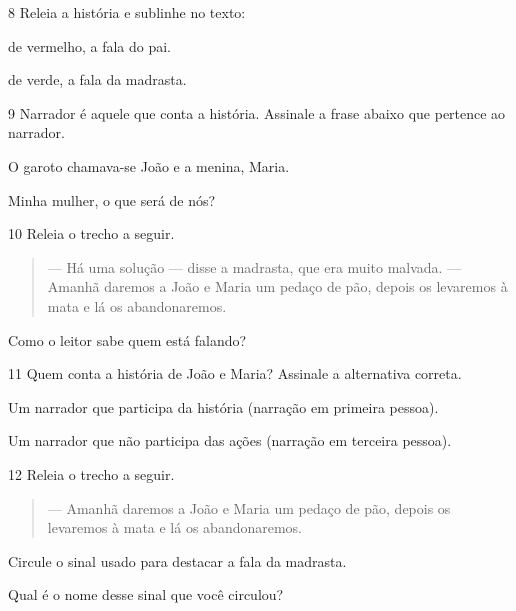 \num{8} Releia a história e sublinhe no texto:

\begin{escolha}
\item de vermelho, a fala do pai.

\item de verde, a fala da madrasta.
\end{escolha}

\num{9} Narrador é aquele que conta a história. Assinale a frase abaixo que
pertence ao narrador.

\begin{escolha}
 O garoto chamava-se João e a menina, Maria.

 Minha mulher, o que será de nós?
\end{escolha}

\num{10} Releia o trecho a seguir.

\begin{quote}
--- Há uma solução --- disse a madrasta, que era muito malvada.
--- Amanhã daremos a João e Maria um pedaço de pão, depois os levaremos
à mata e lá os abandonaremos.
\end{quote}

Como o leitor sabe quem está falando?


\num{11} Quem conta a história de João e Maria? Assinale a alternativa correta.


\begin{boxlist}
 Um narrador que participa da história (narração em primeira pessoa).

 Um narrador que não participa das ações (narração em terceira pessoa).
\end{boxlist}

\num{12} Releia o trecho a seguir.

\begin{quote}
--- Amanhã daremos a João e Maria um pedaço de pão, depois os
levaremos à mata e lá os abandonaremos.
\end{quote}

\begin{escolha}
\item Circule o sinal usado para destacar a fala da madrasta.

\item Qual é o nome desse sinal que você circulou?

\end{escolha}

